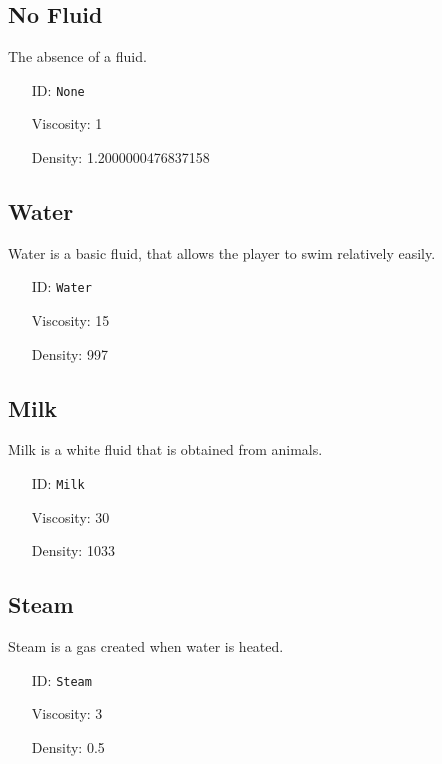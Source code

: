 \subsection{No Fluid}\label{subsec:fluids_no fluid}
The absence of a fluid.
\newline
\begin{itemize}[nosep]
\item[ID:] \texttt{None}
\item[Viscosity:] 1
\item[Density:] 1.2000000476837158
\end{itemize}

\subsection{Water}\label{subsec:fluids_water}
Water is a basic fluid, that allows the player to swim relatively easily.
\newline
\begin{itemize}[nosep]
    \item[ID:] \texttt{Water}
    \item[Viscosity:] 15
    \item[Density:] 997
\end{itemize}

\subsection{Milk}\label{subsec:fluids_milk}
Milk is a white fluid that is obtained from animals.
\newline
\begin{itemize}[nosep]
    \item[ID:] \texttt{Milk}
    \item[Viscosity:] 30
    \item[Density:] 1033
\end{itemize}

\subsection{Steam}\label{subsec:fluids_steam}
Steam is a gas created when water is heated.
\newline
\begin{itemize}[nosep]
    \item[ID:] \texttt{Steam}
    \item[Viscosity:] 3
    \item[Density:] 0.5
\end{itemize}

